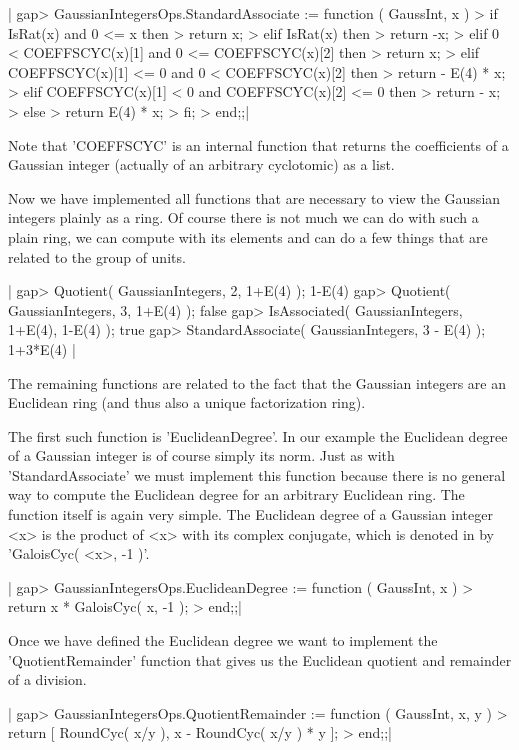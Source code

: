 |    gap> GaussianIntegersOps.StandardAssociate := function ( GaussInt, x )
    >     if   IsRat(x)  and 0 <= x  then
    >         return x;
    >     elif IsRat(x)  then
    >         return -x;
    >     elif 0 <  COEFFSCYC(x)[1]      and 0 <= COEFFSCYC(x)[2]      then
    >         return x;
    >     elif      COEFFSCYC(x)[1] <= 0 and 0 <  COEFFSCYC(x)[2]      then
    >         return - E(4) * x;
    >     elif      COEFFSCYC(x)[1] <  0 and      COEFFSCYC(x)[2] <= 0 then
    >         return - x;
    >     else
    >         return E(4) * x;
    >     fi;
    > end;;|

Note  that  'COEFFSCYC'   is  an   internal  function  that  returns  the
coefficients of  a Gaussian integer (actually of an arbitrary cyclotomic)
as a list.

Now we  have  implemented  all functions that  are necessary to  view the
Gaussian integers plainly as a  ring.  Of course there is not much we can
do with such a plain ring, we can compute with its elements and can  do a
few things that are related to the group of units.

|    gap> Quotient( GaussianIntegers, 2, 1+E(4) );
    1-E(4)
    gap> Quotient( GaussianIntegers, 3, 1+E(4) );
    false
    gap> IsAssociated( GaussianIntegers, 1+E(4), 1-E(4) );
    true
    gap> StandardAssociate( GaussianIntegers, 3 - E(4) );
    1+3*E(4) |

The  remaining functions  are  related  to  the  fact that  the  Gaussian
integers  are  an Euclidean ring  (and thus also  a  unique factorization
ring).

The  first  such function  is  'EuclideanDegree'.   In  our  example  the
Euclidean degree  of a  Gaussian  integer  is of course simply its  norm.
Just as with 'StandardAssociate' we must implement this  function because
there is no general  way to compute the Euclidean degree for an arbitrary
Euclidean ring.  The function itself is again very simple.  The Euclidean
degree of a Gaussian  integer <x> is the  product of <x> with its complex
conjugate, which is denoted in {\GAP} by 'GaloisCyc( <x>, -1 )'.

|    gap> GaussianIntegersOps.EuclideanDegree := function ( GaussInt, x )
    >     return x * GaloisCyc( x, -1 );
    > end;;|

Once  we have  defined  the  Euclidean degree  we want  to  implement the
'QuotientRemainder'  function  that  gives us  the Euclidean quotient and
remainder of a division.

|    gap> GaussianIntegersOps.QuotientRemainder := function ( GaussInt, x, y )
    >     return [ RoundCyc( x/y ),  x - RoundCyc( x/y ) * y ];
    > end;;|

